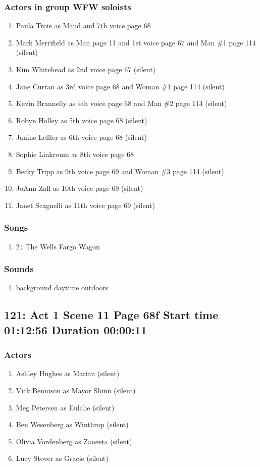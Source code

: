 \subsubsection{Actors in group WFW soloists}
\begin{enumerate}
\item Paula Troie as Maud and 7th voice page 68
\item Mark Merrifield as Man page 11 and 1st voice page 67 and Man \#1 page 114 (silent)
\item Kim Whitehead as 2nd voice page 67 (silent)
\item Jane Curran as 3rd voice page 68 and Woman \#1 page 114 (silent)
\item Kevin Brannelly as 4th voice page 68 and Man \#2 page 114 (silent)
\item Robyn Holley as 5th voice page 68 (silent)
\item Janine Leffler as 6th voice page 68 (silent)
\item Sophie Linkroum as 8th voice page 68
\item Becky Tripp as 9th voice page 69 and Woman \#3 page 114 (silent)
\item JoAnn Zall as 10th voice page 69 (silent)
\item Janet Scagnelli as 11th voice page 69 (silent)
\end{enumerate}

\subsubsection{Songs}
\begin{enumerate}
\item 24 The Wells Fargo Wagon
\end{enumerate}\subsubsection{Sounds}
\begin{enumerate}
\item background daytime outdoors
\end{enumerate}
\subsection{121: Act 1 Scene 11 Page 68f Start time 01:12:56 Duration 00:00:11}

\subsubsection{Actors}
\begin{enumerate}
\item Ashley Hughes as Marian (silent)
\item Vick Bennison as Mayor Shinn (silent)
\item Meg Petersen as Eulalie (silent)
\item Ben Wesenberg as Winthrop (silent)
\item Olivia Vordenberg as Zaneeta (silent)
\item Lucy Stover as Gracie (silent)
\end{enumerate}

